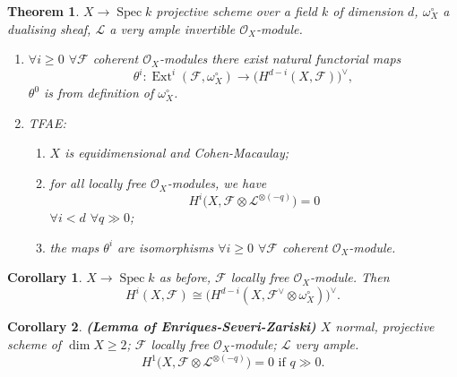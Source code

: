 \documentclass[12pt]{article}
\DeclareMathOperator{\Spec}{Spec}
\DeclareMathOperator{\Ext}{Ext}
\newtheorem*{theorem}{Theorem}
\newtheorem*{corollary}{Corollary}
\theoremstyle{definition}
\theoremstyle{remark}
\newtheorem*{comment}{Comment}
\begin{document}
\begin{theorem}
$X\rightarrow\Spec k$ projective scheme over a field $k$ of dimension $d$, $\omega_X^{\circ}$ a dualising sheaf, $\mathcal{L}$ a very ample invertible $\mathcal{O}_X$-module.

\begin{enumerate}[label=\arabic*)]
\item $\forall i\geq0$ $\forall\mathcal{F}$ coherent $\mathcal{O}_X$-modules there exist natural functorial maps
\[\theta^i:\Ext^i(\mathcal{F},\omega_X^{\circ})\longrightarrow\big(H^{d-i}(X,\mathcal{F})\big)^{\vee},\]
$\theta^0$ is from definition of $\omega_X^{\circ}$.

\item TFAE:
\begin{enumerate}[label=\roman*)]
\item $X$ is equidimensional and Cohen-Macaulay;
\item for all locally free $\mathcal{O}_X$-modules, we have
\[H^i\big(X,\mathcal{F}\otimes\mathcal{L}^{\otimes(-q)}\big)=0\]
$\forall i<d$ $\forall q\gg0$;
\item the maps $\theta^i$ are isomorphisms $\forall i\geq0$ $\forall\mathcal{F}$ coherent $\mathcal{O}_X$-module.
\end{enumerate}
\end{enumerate}
\end{theorem}

\begin{comment}
The height of an ideal is the dimension of the ring minus the dimension of the quotient. It's a measure of the codimension of the variety it generates. ``Equidimensional'' means that all irreducible components have the same dimension. Cohen-Macaulay is a technical condition that is not too relevant and guarantees that dimensions behave as expected.
\end{comment}

\begin{corollary}
$X\rightarrow\Spec k$ as before, $\mathcal{F}$ locally free $\mathcal{O}_X$-module. Then
\[H^i(X,\mathcal{F})\cong\big(H^{d-i}(X,\mathcal{F}^{\vee}\otimes\omega_X^{\circ})\big)^{\vee}.\]
\end{corollary}

\begin{comment}
This holds because $\Ext^i(\mathcal{F},\omega_X^{\circ})=H^i(X,\mathcal{F}^{\vee}\otimes\omega_X^{\circ})$.
\end{comment}

\begin{corollary}
\emph{\textbf{(Lemma of Enriques-Severi-Zariski)}} $X$ normal, projective scheme of $\dim X\geq2$; $\mathcal{F}$ locally free $\mathcal{O}_X$-module; $\mathcal{L}$ very ample.
\[H^1\big(X,\mathcal{F}\otimes\mathcal{L}^{\otimes(-q)}\big)=0\text{ if }q\gg0.\]
\end{corollary}
\end{document}
